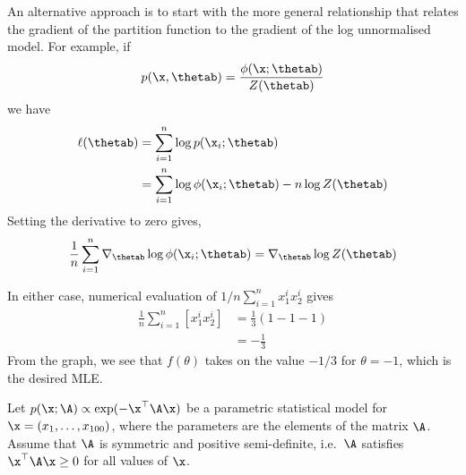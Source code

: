 \begin{exenumerate}
\begin{solution}
    An alternative approach is to start with the more general
    relationship that relates the gradient of the partition function
    to the gradient of the log unnormalised model. For example, if
    $$ p(\x,\thetab) = \frac{\phi(\x; \thetab)}{Z(\thetab)}$$
    we have
    \begin{align}
      \ell(\thetab) &= \sum_{i=1}^n \log p(\x_i;\thetab) \\
      & = \sum_{i=1}^n \log \phi(\x_i;\thetab) -n \log Z(\thetab)
    \end{align}
    Setting the derivative to zero gives,
    $$\frac{1}{n} \sum_{i=1}^n \nabla_{\thetab}  \log \phi(\x_i;\thetab) = \nabla_{\thetab} \log Z(\thetab)$$
      
    In either case, numerical evaluation of  $1/n \sum_{i=1}^n x_1^i x_2^i$ gives
    \begin{align}
      \frac{1}{n}  \sum_{i=1}^n \left[x_1^i x_2^i\right] & = \frac{1}{3}\left(1-1-1\right)\\
      &= -\frac{1}{3}
    \end{align}
    From the graph, we see that $f(\theta)$ takes on the value $-1/3$
    for $\theta = -1$, which is the desired MLE. 

  \end{solution}

\end{exenumerate}

Let $p(\x; \A) \propto \exp(-\x^\top \A \x)$ be a parametric
statistical model for $\x = (x_1, \ldots, x_{100})$, where the
parameters are the elements of the matrix $\A$. Assume that $\A$ is
symmetric and positive semi-definite, i.e.\ $\A$ satisfies $\x^\top
\A \x \ge 0$ for all values of $\x$.

